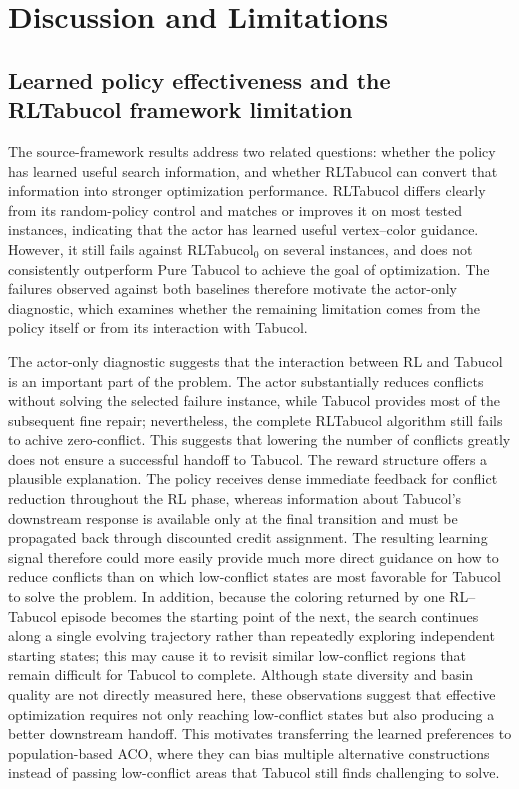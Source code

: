 \section{Discussion and Limitations}
\label{sec:discussion}

\subsection{Learned policy effectiveness and the RLTabucol framework limitation}
\label{ssec:discussion-source}

The source-framework results address two related questions: whether the policy
has learned useful search information, and whether RLTabucol can convert that
information into stronger optimization performance. RLTabucol differs clearly
from its random-policy control and matches or improves it on most tested
instances, indicating that the actor has learned useful vertex--color guidance.
However, it still fails against RLTabucol$_0$ on several instances, and does not
consistently outperform Pure Tabucol to achieve the goal of optimization. The failures observed against both
baselines therefore motivate the actor-only diagnostic, which examines whether
the remaining limitation comes from the policy itself or from its interaction
with Tabucol.

The actor-only diagnostic suggests that the interaction between RL and Tabucol is an important
part of the problem. The actor substantially reduces conflicts without solving
the selected failure instance, while Tabucol provides most of the subsequent
fine repair; nevertheless, the complete RLTabucol algorithm still fails to achive zero-conflict. This suggests that lowering the number of conflicts greatly does not ensure a successful handoff to Tabucol. The reward structure offers a plausible explanation. The
policy receives dense immediate feedback for conflict reduction throughout the
RL phase, whereas information about Tabucol's downstream response is available
only at the final transition and must be propagated back through discounted
credit assignment. The resulting learning signal therefore could more easily provide much more
direct guidance on how to reduce conflicts than on which low-conflict states are
most favorable for Tabucol to solve the problem. In addition, because the coloring returned by
one RL--Tabucol episode becomes the starting point of the next, the search
continues along a single evolving trajectory rather than repeatedly exploring
independent starting states; this may cause it to revisit similar low-conflict
regions that remain difficult for Tabucol to complete. Although state diversity
and basin quality are not directly measured here, these observations suggest
that effective optimization requires not only reaching low-conflict states but
also producing a better downstream handoff. This motivates transferring the
learned preferences to population-based ACO, where they can bias multiple
alternative constructions instead of passing low-conflict areas that Tabucol still finds challenging to solve.

